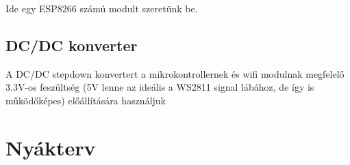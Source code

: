 \documentclass[12pt]{extarticle}
\begin{document}
	Ide egy ESP8266 számú modult szeretünk be.
	
	\subsection{DC/DC konverter}
	
	A DC/DC stepdown konvertert a mikrokontrollernek és wifi modulnak megfelelő 3.3V-os feszültség (5V lenne az ideális a WS2811 signal lábához, de így is működőképes) előállítására használjuk 
	
	\section{Nyákterv}
	
	
	
	
	
	
	
	
	
	
	
	
	
	
	
	
	
	
	
	
	
	
\end{document}

